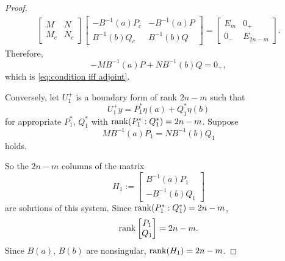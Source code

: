 \documentclass[11pt, oneside, a4paper]{article}
\begin{document}
\begin{proof}
{    }
    \begin{align*}
        \begin{bmatrix}
            M & N\\
            M_c & N_c
        \end{bmatrix}
        \begin{bmatrix}
            -B^{-1}(a)P_c & -B^{-1}(a)P\\
            B^{-1}(b)Q_c & B^{-1}(b)Q
        \end{bmatrix}
        =
        \begin{bmatrix}
            E_m & 0_+\\
            0_- & E_{2n-m}
        \end{bmatrix}.
    \end{align*}
    Therefore,
    \[-MB^{-1}(a)P + NB^{-1}(b)Q = 0_+,\]
    which is \eqref{eq:condition iff adjoint}.

    Conversely, let $U_1^+$ is a boundary form of rank $2n-m$ such that
    \[U_1^+y = P_1^*\eta(a) + Q_1^*\eta(b)\]
    for appropriate $P_1^*$, $Q_1^*$ with $\operatorname{rank}(P_1^*:Q_1^*)=2n-m$. Suppose
    \begin{equation}\label{eq:condition iff adjoint converse}
        MB^{-1}(a)P_1 = NB^{-1}(b)Q_1
    \end{equation}
    holds.

    So the $2n-m$ columns of the matrix
    \[H_1:= \begin{bmatrix}
        B^{-1}(a)P_1\\
        -B^{-1}(b)Q_1
    \end{bmatrix}\]
    are solutions of this system. Since $\operatorname{rank}(P_1^*:Q_1^*)=2n-m$,
    \[\operatorname{rank}\begin{bmatrix}P_1\\ Q_1\end{bmatrix}=2n-m.\]
    Since $B(a)$, $B(b)$ are nonsingular, $\operatorname{rank}(H_1)=2n-m$.


\end{proof}
\end{document}
